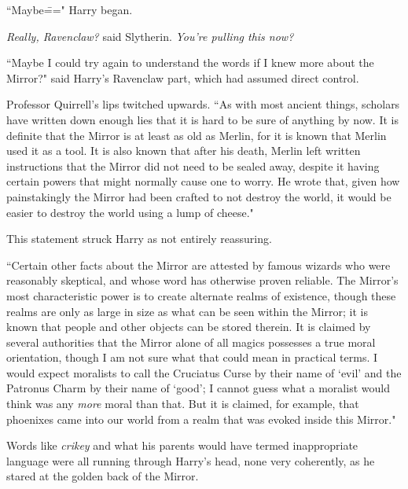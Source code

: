 ``Maybe\===" Harry began.

\emph{Really, Ravenclaw?} said Slytherin. \emph{You're pulling this \emph{now}?}

``Maybe I could try again to understand the words if I knew more about the Mirror?" said Harry's Ravenclaw part, which had assumed direct control.

Professor Quirrell's lips twitched upwards. ``As with most ancient things, scholars have written down enough lies that it is hard to be sure of anything by now. It is definite that the Mirror is at least as old as Merlin, for it is known that Merlin used it as a tool. It is also known that after his death, Merlin left written instructions that the Mirror did not need to be sealed away, despite it having certain powers that might normally cause one to worry. He wrote that, given how painstakingly the Mirror had been crafted to not destroy the world, it would be easier to destroy the world using a lump of cheese."

This statement struck Harry as not entirely reassuring.

``Certain other facts about the Mirror are attested by famous wizards who were reasonably skeptical, and whose word has otherwise proven reliable. The Mirror's most characteristic power is to create alternate realms of existence, though these realms are only as large in size as what can be seen within the Mirror; it is known that people and other objects can be stored therein. It is claimed by several authorities that the Mirror alone of all magics possesses a true moral orientation, though I am not sure what that could mean in practical terms. I would expect moralists to call the Cruciatus Curse by their name of `evil' and the Patronus Charm by their name of `good'; I cannot guess what a moralist would think was any \emph{more} moral than that. But it is claimed, for example, that phoenixes came into our world from a realm that was evoked inside this Mirror."

Words like \emph{crikey} and what his parents would have termed inappropriate language were all running through Harry's head, none very coherently, as he stared at the golden back of the Mirror.

